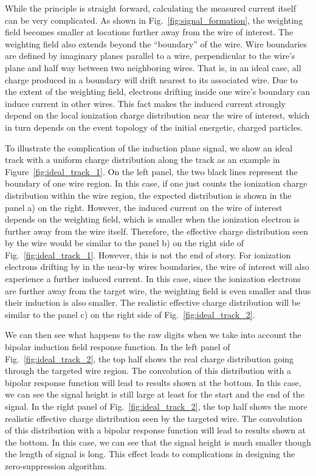 While the principle is straight forward, calculating the measured
current itself can be very complicated. As shown in
Fig.~\ref{fig:signal_formation}, the weighting field becomes smaller
at locations further away from the wire of interest.  
The weighting field also extends beyond the ``boundary'' of the wire.
Wire boundaries are defined by imaginary planes parallel to a wire,
perpendicular to the wire's plane and half way between two neighboring
wires.  That is, in an ideal case, all charge produced in a boundary
will drift nearest to its associated wire.
Due to the extent of the weighting field, electrons drifting inside
one wire's boundary can induce current in other wires.  This fact
makes the induced current strongly depend on the local ionization
charge distribution near the wire of interest, which in turn depends
on the event topology of the initial energetic, charged particles.


To illustrate the complication of the induction plane signal, we show an ideal track with a uniform charge 
distribution along the track as an example in Figure~\ref{fig:ideal_track_1}.
On the left panel, the two black lines represent the boundary of one wire region. In this case, 
if one just counts the ionization charge distribution within the wire region, the expected 
distribution is shown in the panel a) on the right.  However, the induced current on the wire of 
interest depends on the weighting field, which is smaller when the ionization electron is 
further away from the wire itself. Therefore, the effective charge distribution seen by 
the wire would be similar to the panel b) on the right side of 
Fig.~\ref{fig:ideal_track_1}. However, this is not the end of story. For ionization electrons 
drifting by in the near-by wires boundaries, the wire of interest will also experience a 
further induced current. In this case, since the ionization electrons are further away 
from the target wire, the weighting field is even smaller and thus their induction is 
also smaller. The realistic effective charge distribution will be similar to the panel c) on 
the right side of Fig.~\ref{fig:ideal_track_2}. 

We can then see what happens to the raw digits when we take into account the bipolar induction 
field response function. In the left panel of Fig.~\ref{fig:ideal_track_2}, the top half shows 
the real charge distribution going through the targeted wire region. The convolution of this 
distribution with a bipolar response function will lead to results shown at the bottom. In this 
case, we can see the signal height is still large at least for the start and the end of the 
signal. In the right panel of Fig.~\ref{fig:ideal_track_2}, the top half shows the more 
realistic effective charge distribution seen by the targeted wire. The convolution of this 
distribution with a bipolar response function will lead to results shown at the bottom. In 
this case, we can see that the signal height is much smaller though the length of signal is 
long. This effect leads to complications in designing the zero-suppression algorithm.



